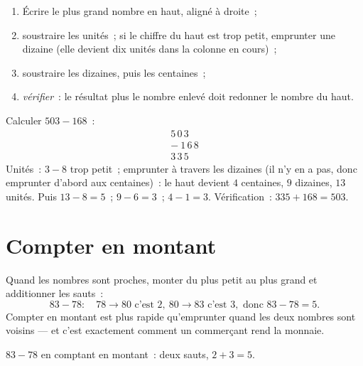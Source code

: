 \begin{method}\label{met:g2:subtraction:column}
\begin{enumerate}
  \item Écrire le plus grand nombre en haut, aligné à droite~;
  \item soustraire les unités~; si le chiffre du haut est trop
        petit, emprunter une dizaine (elle devient dix unités dans
        la colonne en cours)~;
  \item soustraire les dizaines, puis les centaines~;
  \item \emph{vérifier}~: le résultat plus le nombre enlevé
        doit redonner le nombre du haut.
\end{enumerate}
\end{method}

\begin{example}\label{ex:g2:subtraction:worked}
Calculer $503 - 168$~:
\[
\begin{array}{r}
5\,0\,3 \\
-\ 1\,6\,8 \\
\hline
3\,3\,5
\end{array}
\]
Unités~: $3 - 8$ trop petit~; emprunter à travers les dizaines
(il n'y en a pas, donc emprunter d'abord aux centaines)~: le haut
devient $4$ centaines, $9$ dizaines, $13$ unités. Puis
$13 - 8 = 5$~; $9 - 6 = 3$~; $4 - 1 = 3$. Vérification~:
$335 + 168 = 503$. \checkmark
\end{example}

\section{Compter en montant}

\begin{method}\label{met:g2:subtraction:countup}
Quand les nombres sont proches, monter du plus petit au plus grand
et additionner les sauts~:
\[
83 - 78: \quad 78 \to 80 \text{ c'est } 2, \ 80 \to 83 \text{ c'est } 3,
\text{ donc } 83 - 78 = 5 .
\]
Compter en montant est plus rapide qu'emprunter quand les deux
nombres sont voisins --- et c'est exactement comment un commerçant
rend la monnaie.
\end{method}

\begin{omfigure}

{\small $83 - 78$ en comptant en montant~: deux sauts, $2 + 3 = 5$.}
\end{omfigure}

